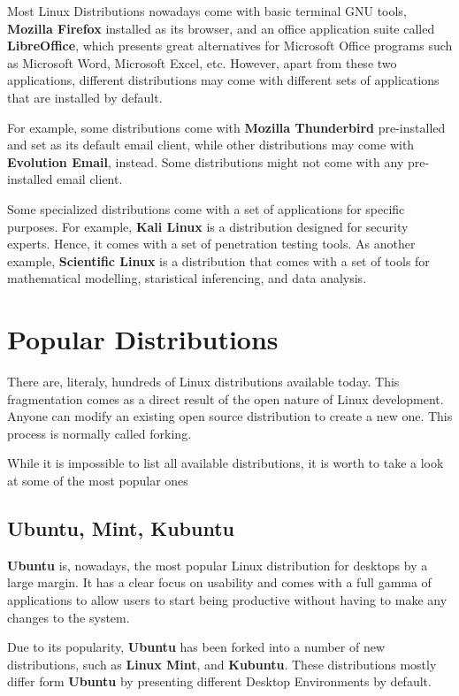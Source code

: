 Most Linux Distributions nowadays come with basic terminal \acs{GNU} tools, \textbf{Mozilla Firefox} installed as its browser, and an office application suite called \textbf{LibreOffice}, which presents great alternatives for Microsoft Office programs such as Microsoft Word, Microsoft Excel, etc. However, apart from these two applications, different distributions may come with different sets of applications that are installed by default.

For example, some distributions come with \textbf{Mozilla Thunderbird} pre-installed and set as its default email client, while other distributions may come with \textbf{Evolution Email}, instead. Some distributions might not come with any pre-installed email client.

Some specialized distributions come with a set of applications for specific purposes. For example, \textbf{Kali Linux} is a distribution designed for security experts. Hence, it comes with a set of penetration testing tools. As another example, \textbf{Scientific Linux} is a distribution that comes with a set of tools for mathematical modelling, staristical inferencing, and data analysis.

\section{Popular Distributions}

There are, literaly, hundreds of Linux distributions available today. This fragmentation comes as a direct result of the open nature of Linux development. Anyone can modify an existing open source distribution to create a new one. This process is normally called forking.

While it is impossible to list all available distributions, it is worth to take a look at some of the most popular ones


\subsection{Ubuntu, Mint, Kubuntu}
\textbf{Ubuntu} is, nowadays, the most popular Linux distribution for desktops by a large margin. It has a clear focus on usability and comes with a full gamma of applications to allow users to start being productive without having to make any changes to the system.

Due to its popularity, \textbf{Ubuntu} has been forked into a number of new distributions, such as \textbf{Linux Mint}, and \textbf{Kubuntu}. These distributions mostly differ form \textbf{Ubuntu} by presenting different Desktop Environments by default.

